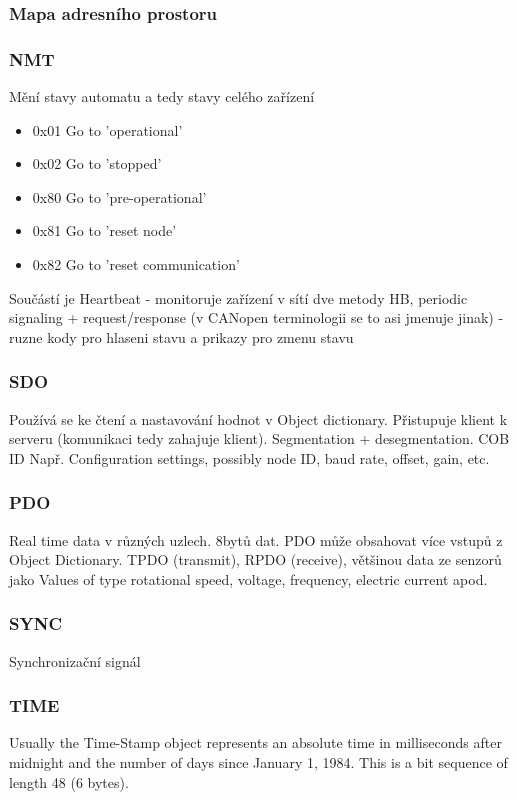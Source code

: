 \documentclass[
  field=ainfk,
  biblatex,
  glossaries,
  index
]{kidiplom}
\begin{document}
\subsubsection{Mapa adresního prostoru}

\subsubsection{NMT}
Mění stavy automatu a tedy stavy celého zařízení

\begin{itemize}
    \item 0x01  Go to 'operational'
    \item 0x02  Go to 'stopped'
    \item 0x80  Go to 'pre-operational'
    \item 0x81  Go to 'reset node'
    \item 0x82  Go to 'reset communication'
\end{itemize}

Součástí je Heartbeat - monitoruje zařízení v sítí
dve metody HB, periodic signaling + request/response (v CANopen terminologii se to asi jmenuje jinak) - ruzne kody pro hlaseni stavu a prikazy pro zmenu stavu

\subsubsection{SDO}
Používá se ke čtení a nastavování hodnot v Object dictionary. Přistupuje klient k serveru (komunikaci tedy zahajuje klient). Segmentation + desegmentation. COB ID Např. Configuration settings, possibly node ID, baud rate, offset, gain, etc.

\subsubsection{PDO}
Real time data v různých uzlech. 8bytů dat. PDO může obsahovat více vstupů z Object Dictionary. TPDO (transmit), RPDO (receive), většinou data ze senzorů jako Values of type rotational speed, voltage, frequency, electric current apod.

\subsubsection{SYNC}
Synchronizační signál

\subsubsection{TIME}
Usually the Time-Stamp object represents an absolute time in milliseconds after midnight and the number of days since January 1, 1984. This is a bit sequence of length 48 (6 bytes).
\end{document}
